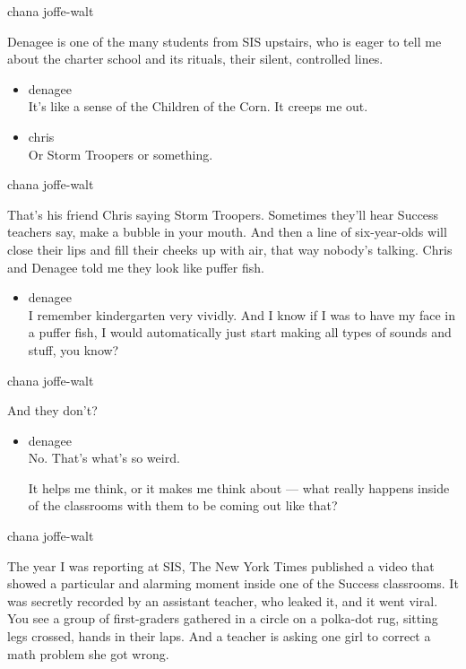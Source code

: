 chana joffe-walt

Denagee is one of the many students from SIS upstairs, who is eager to
tell me about the charter school and its rituals, their silent,
controlled lines.

\begin{itemize}
\item
  denagee\\
  It's like a sense of the Children of the Corn. It creeps me out.
\item
  chris\\
  Or Storm Troopers or something.
\end{itemize}

chana joffe-walt

That's his friend Chris saying Storm Troopers. Sometimes they'll hear
Success teachers say, make a bubble in your mouth. And then a line of
six-year-olds will close their lips and fill their cheeks up with air,
that way nobody's talking. Chris and Denagee told me they look like
puffer fish.

\begin{itemize}
\tightlist
\item
  denagee\\
  I remember kindergarten very vividly. And I know if I was to have my
  face in a puffer fish, I would automatically just start making all
  types of sounds and stuff, you know?
\end{itemize}

chana joffe-walt

And they don't?

\begin{itemize}
\item
  denagee\\
  No. That's what's so weird.

  It helps me think, or it makes me think about --- what really happens
  inside of the classrooms with them to be coming out like that?
\end{itemize}

chana joffe-walt

The year I was reporting at SIS, The New York Times published a video
that showed a particular and alarming moment inside one of the Success
classrooms. It was secretly recorded by an assistant teacher, who leaked
it, and it went viral. You see a group of first-graders gathered in a
circle on a polka-dot rug, sitting legs crossed, hands in their laps.
And a teacher is asking one girl to correct a math problem she got
wrong.

